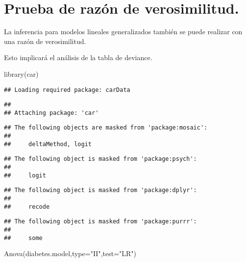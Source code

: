 \documentclass[
]{book}
\newenvironment{Shaded}{\begin{snugshade}}{\end{snugshade}}
\newcommand{\AttributeTok}[1]{\textcolor[rgb]{0.77,0.63,0.00}{#1}}
\newcommand{\FunctionTok}[1]{\textcolor[rgb]{0.00,0.00,0.00}{#1}}
\newcommand{\NormalTok}[1]{#1}
\newcommand{\StringTok}[1]{\textcolor[rgb]{0.31,0.60,0.02}{#1}}
\begin{document}
\hypertarget{prueba-de-razuxf3n-de-verosimilitud.}{%
\chapter{Prueba de razón de verosimilitud.}\label{prueba-de-razuxf3n-de-verosimilitud.}}

La inferencia para modelos lineales generalizados también se puede realizar con una razón de verosimilitud.

Esto implicará el análisis de la tabla de deviance.

\begin{Shaded}
\begin{Highlighting}[]
\FunctionTok{library}\NormalTok{(car)}
\end{Highlighting}
\end{Shaded}

\begin{verbatim}
## Loading required package: carData
\end{verbatim}

\begin{verbatim}
## 
## Attaching package: 'car'
\end{verbatim}

\begin{verbatim}
## The following objects are masked from 'package:mosaic':
## 
##     deltaMethod, logit
\end{verbatim}

\begin{verbatim}
## The following object is masked from 'package:psych':
## 
##     logit
\end{verbatim}

\begin{verbatim}
## The following object is masked from 'package:dplyr':
## 
##     recode
\end{verbatim}

\begin{verbatim}
## The following object is masked from 'package:purrr':
## 
##     some
\end{verbatim}

\begin{Shaded}
\begin{Highlighting}[]
\FunctionTok{Anova}\NormalTok{(diabetes.model,}\AttributeTok{type=}\StringTok{"II"}\NormalTok{,}\AttributeTok{test=}\StringTok{"LR"}\NormalTok{)}
\end{Highlighting}
\end{Shaded}
\end{document}
